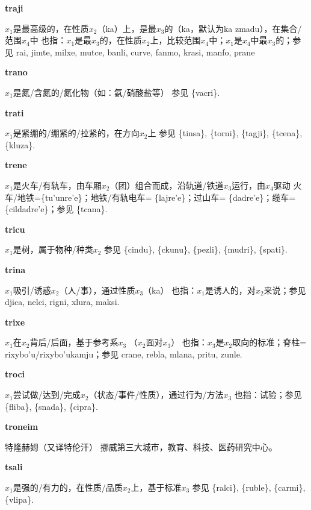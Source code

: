 \documentclass[notitlepage,twocolumn,a4paper,10pt]{book}
\begin{document}
{\sffamily\bfseries traji}\enspace {\ttfamily\bfseries[        rai]}  $x_1$是最高级的，在性质$x_2$（ka）上，是最$x_3$的（ka，默认为ka zmadu），在集合\slash{}范围$x_4$中 \textemdash{} 也指：$x_1$是最$x_3$的，在性质$x_2$上，比较范围$x_4$中；$x_1$是$x_4$中最$x_3$的；参见 {rai}, {jimte}, {milxe}, {mutce}, {banli}, {curve}, {fanmo}, {krasi}, {manfo}, {prane}

{\sffamily\bfseries trano} $x_1$是氮\slash{}含氮的\slash{}氮化物（如：氨\slash{}硝酸盐等） \textemdash{} 参见 \{vacri\}.

{\sffamily\bfseries trati} $x_1$是紧绷的\slash{}绷紧的\slash{}拉紧的，在方向$x_2$上 \textemdash{} 参见 \{tinsa\}, \{torni\}, \{tagji\}, \{tcena\}, \{kluza\}.

{\sffamily\bfseries trene}\enspace {\ttfamily\bfseries[ren     re'e]}  $x_1$是火车\slash{}有轨车，由车厢$x_2$（团）组合而成，沿轨道\slash{}铁道$x_3$运行，由$x_4$驱动 \textemdash{} 火车\slash{}地铁=\{tu'unre'e\}；地铁\slash{}有轨电车= \{lajre'e\}；过山车= \{dadre'e\}；缆车= \{cildadre'e\}；参见 \{tcana\}.

{\sffamily\bfseries tricu}\enspace {\ttfamily\bfseries[ric]}  $x_1$是树，属于物种\slash{}种类$x_2$ \textemdash{} 参见 \{cindu\}, \{ckunu\}, \{pezli\}, \{mudri\}, \{spati\}.

{\sffamily\bfseries trina}\enspace {\ttfamily\bfseries[    tri]}  $x_1$吸引\slash{}诱惑$x_2$（人\slash{}事），通过性质$x_3$（ka） \textemdash{} 也指：$x_1$是诱人的，对$x_2$来说；参见 {djica}, {nelci}, {rigni}, {xlura}, {maksi}.

{\sffamily\bfseries trixe}\enspace {\ttfamily\bfseries[rix     ti'e]}  $x_1$在$x_2$背后\slash{}后面，基于参考系$x_3$ （$x_2$面对$x_3$） \textemdash{} 也指：$x_3$是$x_2$取向的标准；脊柱= {rixybo'u}\slash{}{rixybo'ukamju}；参见 {crane}, {rebla}, {mlana}, {pritu}, {zunle}.

{\sffamily\bfseries troci}  $x_1$尝试做\slash{}达到\slash{}完成$x_2$（状态\slash{}事件\slash{}性质），通过行为\slash{}方法$x_3$ \textemdash{} 也指：试验；参见 \{fliba\}, \{snada\}, \{cipra\}.

{\sffamily\bfseries troneim} 特隆赫姆（又译特伦汗） \textemdash{} 挪威第三大城市，教育、科技、医药研究中心。

{\sffamily\bfseries tsali}\enspace {\ttfamily\bfseries[    tsa]}  $x_1$是强的\slash{}有力的，在性质\slash{}品质$x_2$上，基于标准$x_3$ \textemdash{} 参见 \{ralci\}, \{ruble\}, \{carmi\}, \{vlipa\}.
\end{document}
